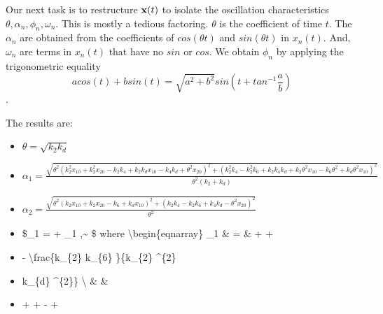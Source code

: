 \documentclass[11pt]{article}
\begin{document}
    Our next task is to restructure \({\bf x} (t)\) to isolate the
oscillation characteristics \(\theta, \alpha_n, \phi_n, \omega_n\). This
is mostly a tedious factoring. \(\theta\) is the coefficient of time
\(t\). The \(\alpha_n\) are obtained from the coefficients of
\(cos(\theta t)\) and \(sin(\theta t)\) in \(x_n (t)\). And,
\(\omega_n\) are terms in \(x_n (t)\) that have no \(sin\) or \(cos\).
We obtain \(\phi_n\) by applying the trigonometric equality
\[a cos(t) + b sin(t) = \sqrt{a^2 + b^2} sin(t + tan^{-1}\frac{a}{b})
\].

    The results are:

\begin{itemize}
\item
  \(\theta = \sqrt{k_2 k_d}\)
\item
  \(\alpha_1 = \frac{\sqrt{\theta^{2} \left(k_{2}^{2} x_{1 0} + k_{2}^{2} x_{2 0} - k_{2} k_{4} + k_{2} k_{d} x_{1 0} - k_{4} k_{d} + \theta^{2} x_{2 0}\right)^{2} + \left(k_{2}^{2} k_{4} - k_{2}^{2} k_{6} + k_{2} k_{4} k_{d} + k_{2} \theta^{2} x_{1 0} - k_{6} \theta^{2} + k_{d} \theta^{2} x_{1 0}\right)^{2}}}{\theta^{2} \left(k_{2} + k_{d}\right)}\)
\item
  \(\alpha_2 = \frac{\sqrt{\theta^{2} \left(k_{2} x_{1 0} + k_{2} x_{2 0} - k_{6} + k_{d} x_{1 0}\right)^{2} + \left(k_{2} k_{4} - k_{2} k_{6} + k_{4} k_{d} - \theta^{2} x_{2 0}\right)^{2}}}{\theta^{2}}\)
\item
  \$\phi\_1 =
  + \delta\_1 \pi,\textasciitilde{} \$ where
  \textbackslash begin\{eqnarray\} \delta\_1 \& = \&
   +
   +
\item
   -
  \textbackslash frac\{k\_\{2\} k\_\{6\} \theta\}\{k\_\{2\}
  \theta\^{}\{2\}
\item
  k\_\{d\} \theta\^{}\{2\}\} \textbackslash{} \& \&
\item
   +
   +
   -  +

\end{itemize}
\end{document}
